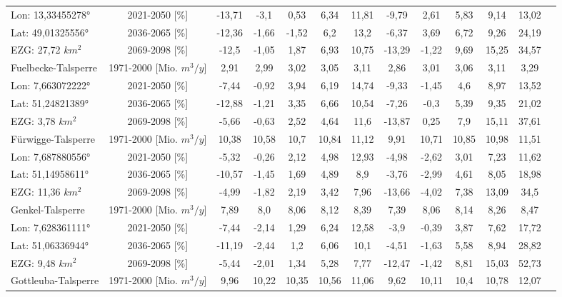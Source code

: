 \begin{longtable}{@{\extracolsep{\fill}}lc|ccccc||cccccc}
\cline{2-13} 
Lon: 13,33455278° & 2021-2050 [\%]  & -13,71 & -3,1 & 0,53 & 6,34 & 11,81 & -9,79 & 2,61 & 5,83 & 9,14 & 13,02 & \\ 
Lat: 49,01325556° & 2036-2065 [\%]  & -12,36 & -1,66 & -1,52 & 6,2 & 13,2 & -6,37 & 3,69 & 6,72 & 9,26 & 24,19 & \\ 
EZG: 27,72 $km^2$ & 2069-2098 [\%]  & -12,5 & -1,05 & 1,87 & 6,93 & 10,75 & -13,29 & -1,22 & 9,69 & 15,25 & 34,57 & \\ 
\hline 
Fuelbecke-Talsperre & 1971-2000 [Mio. $m^3/y$]  & 2,91 & 2,99 & 3,02 & 3,05 & 3,11 & 2,86 & 3,01 & 3,06 & 3,11 & 3,29 & \\ 
\cline{2-13} 
Lon: 7,663072222° & 2021-2050 [\%]  & -7,44 & -0,92 & 3,94 & 6,19 & 14,74 & -9,33 & -1,45 & 4,6 & 8,97 & 13,52 & \\ 
Lat: 51,24821389° & 2036-2065 [\%]  & -12,88 & -1,21 & 3,35 & 6,66 & 10,54 & -7,26 & -0,3 & 5,39 & 9,35 & 21,02 & \\ 
EZG: 3,78 $km^2$ & 2069-2098 [\%]  & -5,66 & -0,63 & 2,52 & 4,64 & 11,6 & -13,87 & 0,25 & 7,9 & 15,11 & 37,61 & \\ 
\hline 
Fürwigge-Talsperre & 1971-2000 [Mio. $m^3/y$]  & 10,38 & 10,58 & 10,7 & 10,84 & 11,12 & 9,91 & 10,71 & 10,85 & 10,98 & 11,51 & \\ 
\cline{2-13} 
Lon: 7,687880556° & 2021-2050 [\%]  & -5,32 & -0,26 & 2,12 & 4,98 & 12,93 & -4,98 & -2,62 & 3,01 & 7,23 & 11,62 & \\ 
Lat: 51,14958611° & 2036-2065 [\%]  & -10,57 & -1,45 & 1,69 & 4,89 & 8,9 & -3,76 & -2,99 & 4,61 & 8,05 & 18,98 & \\ 
EZG: 11,36 $km^2$ & 2069-2098 [\%]  & -4,99 & -1,82 & 2,19 & 3,42 & 7,96 & -13,66 & -4,02 & 7,38 & 13,09 & 34,5 & \\ 
\hline 
Genkel-Talsperre & 1971-2000 [Mio. $m^3/y$]  & 7,89 & 8,0 & 8,06 & 8,12 & 8,39 & 7,39 & 8,06 & 8,14 & 8,26 & 8,47 & \\ 
\cline{2-13} 
Lon: 7,628361111° & 2021-2050 [\%]  & -7,44 & -2,14 & 1,29 & 6,24 & 12,58 & -3,9 & -0,39 & 3,87 & 7,62 & 17,72 & \\ 
Lat: 51,06336944° & 2036-2065 [\%]  & -11,19 & -2,44 & 1,2 & 6,06 & 10,1 & -4,51 & -1,63 & 5,58 & 8,94 & 28,82 & \\ 
EZG: 9,48 $km^2$ & 2069-2098 [\%]  & -5,44 & -2,01 & 1,34 & 5,28 & 7,77 & -12,47 & -1,42 & 8,81 & 15,03 & 52,73 & \\ 
\hline 
Gottleuba-Talsperre & 1971-2000 [Mio. $m^3/y$]  & 9,96 & 10,22 & 10,35 & 10,56 & 11,06 & 9,62 & 10,11 & 10,4 & 10,78 & 12,07 & \\ 

\end{longtable}
